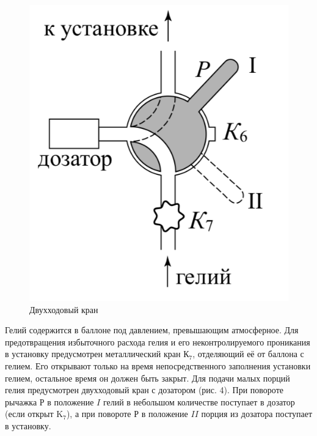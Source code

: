\documentclass[a4paper,12pt]{article}
\theoremstyle{plain} %
\theoremstyle{definition} %
\theoremstyle{remark} %
\begin{document}
\begin{figure}
	\includegraphics[width=\linewidth]{4}
	\caption{Двухходовый кран}
\end{figure}

Гелий содержится в баллоне  под давлением, превышающим атмосферное. Для предотвращения избыточного расхода гелия и его неконтролируемого проникания в установку предусмотрен металлический кран $К_7$, отделяющий её от баллона с гелием. Его открывают только на время непосредственного заполнения установки гелием, остальное время он должен быть закрыт. Для подачи малых порций гелия предусмотрен двухходовый кран с дозатором (рис. 4). При повороте рычажка $\text{Р}$ в положение $I$ гелий в небольшом количестве поступает в дозатор (если открыт $\text{K}_7$), а при повороте $\text{Р}$ в положение $II$ порция из дозатора поступает в установку.

\renewcommand{\arraystretch}{1.1}
\end{document}
